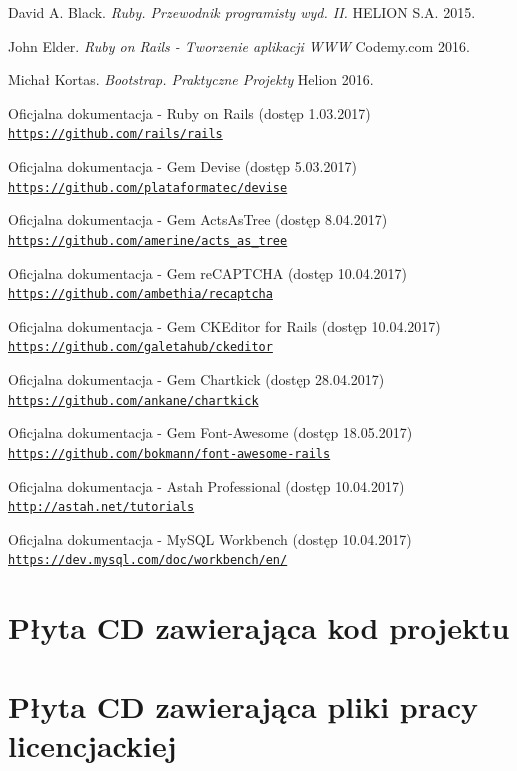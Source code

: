 \documentclass[brudnopis]{xmgr}
\begin{document}
\begin{thebibliography}{9}

David A. Black.
\textit{Ruby. Przewodnik programisty wyd. II.}
HELION S.A. 2015.

John Elder.
\textit{Ruby on Rails - Tworzenie aplikacji WWW}
Codemy.com 2016.

Michał Kortas.
\textit{Bootstrap. Praktyczne Projekty}
Helion 2016.

Oficjalna dokumentacja - Ruby on Rails (dostęp 1.03.2017)
\\\texttt{\url{https://github.com/rails/rails}}


Oficjalna dokumentacja - Gem Devise (dostęp 5.03.2017)
\\\texttt{\url{https://github.com/plataformatec/devise}}


Oficjalna dokumentacja - Gem ActsAsTree (dostęp 8.04.2017)
\\\texttt{\url{https://github.com/amerine/acts_as_tree}}


Oficjalna dokumentacja - Gem reCAPTCHA  (dostęp 10.04.2017)
\\\texttt{\url{https://github.com/ambethia/recaptcha}}


Oficjalna dokumentacja - Gem CKEditor for Rails (dostęp 10.04.2017)
\\\texttt{\url{https://github.com/galetahub/ckeditor}}


Oficjalna dokumentacja - Gem Chartkick (dostęp 28.04.2017)
\\\texttt{\url{https://github.com/ankane/chartkick}}


Oficjalna dokumentacja - Gem Font-Awesome (dostęp 18.05.2017)
\\\texttt{\url{https://github.com/bokmann/font-awesome-rails}}


Oficjalna dokumentacja - Astah Professional (dostęp 10.04.2017)
\\\texttt{\url{http://astah.net/tutorials}}


Oficjalna dokumentacja - MySQL Workbench (dostęp 10.04.2017)
\\\texttt{\url{https://dev.mysql.com/doc/workbench/en/}}

\end{thebibliography}

\appendix
\chapter{Płyta CD zawierająca kod projektu}

\chapter{Płyta CD zawierająca pliki pracy licencjackiej}


\listoffigures


\oswiadczenie
\end{document}
